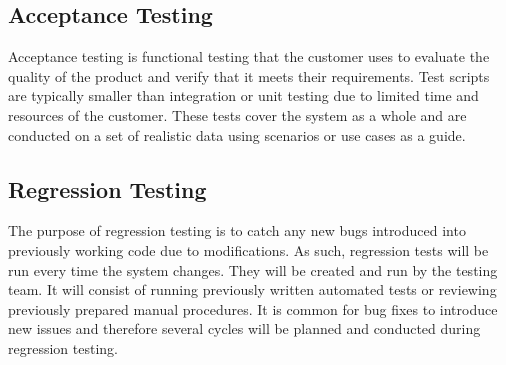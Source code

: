 \documentclass[a3paper, 11pt]{article}
\begin{document}
\subsection{Acceptance Testing}
Acceptance testing is functional testing that the customer uses to evaluate the quality of the product and verify that it meets their requirements. Test scripts are typically smaller than integration or unit testing due to limited time and resources of the customer. These tests cover the system as a whole and are conducted on a set of realistic data using scenarios or use cases as a guide. 

\subsection{Regression Testing}
The purpose of regression testing is to catch any new bugs introduced into previously working code due to modifications. As such, regression tests will be run every time the system changes. They will be created and run by the testing team. It will consist of running previously written automated tests or reviewing previously prepared manual procedures. It is common for bug fixes to introduce new issues and therefore several cycles will be planned and conducted during regression testing. 
\end{document}
